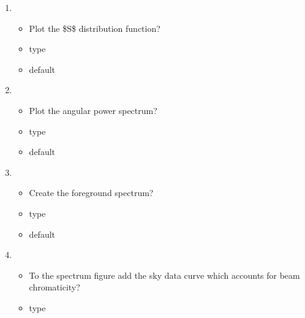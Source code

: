 \documentclass[letterpaper,10pt,english]{sphinxmanual}
\begin{document}
\begin{enumerate}
\begin{itemize}
\end{itemize}

\item {} 
\sphinxAtStartPar
{}
\begin{itemize}
\item {} 
\sphinxAtStartPar
Plot the \$S\$ distribution function?

\item {} 
\sphinxAtStartPar
type 

\item {} 
\sphinxAtStartPar
default 

\end{itemize}

\item {} 
\sphinxAtStartPar
{}
\begin{itemize}
\item {} 
\sphinxAtStartPar
Plot the angular power spectrum?

\item {} 
\sphinxAtStartPar
type 

\item {} 
\sphinxAtStartPar
default 

\end{itemize}

\item {} 
\sphinxAtStartPar
{}
\begin{itemize}
\item {} 
\sphinxAtStartPar
Create the foreground spectrum?

\item {} 
\sphinxAtStartPar
type 

\item {} 
\sphinxAtStartPar
default 

\end{itemize}

\item {} 
\sphinxAtStartPar
{}
\begin{itemize}
\item {} 
\sphinxAtStartPar
To the spectrum figure add the sky data curve which accounts for
beam chromaticity?

\item {} 
\sphinxAtStartPar
type 


\end{itemize}
\end{enumerate}
\end{document}
